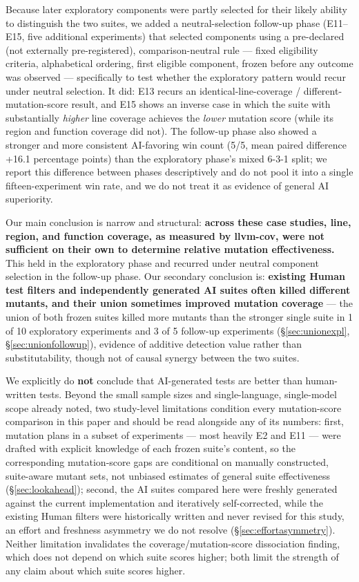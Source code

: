 \documentclass[10pt,conference]{IEEEtran}
\begin{document}
Because later exploratory components were partly selected for their likely ability to distinguish the two suites, we added a neutral-selection follow-up phase (E11--E15, five additional experiments) that selected components using a pre-declared (not externally pre-registered), comparison-neutral rule — fixed eligibility criteria, alphabetical ordering, first eligible component, frozen before any outcome was observed — specifically to test whether the exploratory pattern would recur under neutral selection. It did: E13 recurs an identical-line-coverage / different-mutation-score result, and E15 shows an inverse case in which the suite with substantially \emph{higher} line coverage achieves the \emph{lower} mutation score (while its region and function coverage did not). The follow-up phase also showed a stronger and more consistent AI-favoring win count (5/5, mean paired difference +16.1 percentage points) than the exploratory phase's mixed 6-3-1 split; we report this difference between phases descriptively and do not pool it into a single fifteen-experiment win rate, and we do not treat it as evidence of general AI superiority.

Our main conclusion is narrow and structural: \textbf{across these case studies, line, region, and function coverage, as measured by llvm-cov, were not sufficient on their own to determine relative mutation effectiveness.} This held in the exploratory phase and recurred under neutral component selection in the follow-up phase. Our secondary conclusion is: \textbf{existing Human test filters and independently generated AI suites often killed different mutants, and their union sometimes improved mutation coverage} — the union of both frozen suites killed more mutants than the stronger single suite in 1 of 10 exploratory experiments and 3 of 5 follow-up experiments (\S\ref{sec:unionexpl}, \S\ref{sec:unionfollowup}), evidence of additive detection value rather than substitutability, though not of causal synergy between the two suites.

We explicitly do \textbf{not} conclude that AI-generated tests are better than human-written tests. Beyond the small sample sizes and single-language, single-model scope already noted, two study-level limitations condition every mutation-score comparison in this paper and should be read alongside any of its numbers: first, mutation plans in a subset of experiments — most heavily E2 and E11 — were drafted with explicit knowledge of each frozen suite's content, so the corresponding mutation-score gaps are conditional on manually constructed, suite-aware mutant sets, not unbiased estimates of general suite effectiveness (\S\ref{sec:lookahead}); second, the AI suites compared here were freshly generated against the current implementation and iteratively self-corrected, while the existing Human filters were historically written and never revised for this study, an effort and freshness asymmetry we do not resolve (\S\ref{sec:effortasymmetry}). Neither limitation invalidates the coverage/mutation-score dissociation finding, which does not depend on which suite scores higher; both limit the strength of any claim about which suite scores higher.
\end{document}
